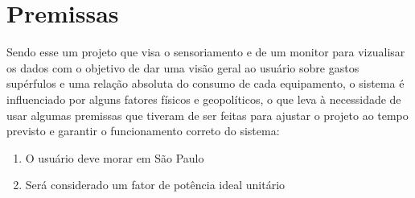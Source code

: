 \section{Premissas}

Sendo esse um projeto que visa o sensoriamento e de um monitor para vizualisar os dados com o objetivo de dar uma visão geral ao usuário sobre gastos supérfulos e uma relação absoluta do consumo de cada equipamento, o sistema é influenciado por alguns fatores físicos e geopolíticos, o que leva à necessidade de usar algumas premissas que tiveram de ser feitas para ajustar o projeto ao tempo previsto e garantir o funcionamento correto do sistema:

\begin{enumerate}
\item{O usuário deve morar em São Paulo}
\item{Será considerado um fator de potência ideal unitário}
\end{enumerate}